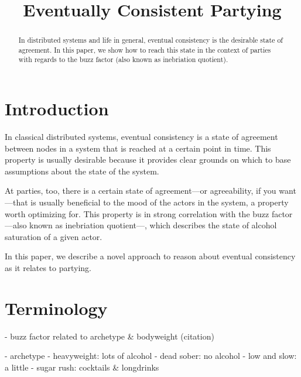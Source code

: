 \documentclass[9pt]{sigplanconf}
\title{Eventually Consistent Partying}
\begin{document}
\maketitle

\begin{abstract}
In distributed systems and life in general, eventual consistency is the
desirable state of agreement. In this paper, we show how to reach this state in
the context of parties with regards to the buzz factor (also known as
inebriation quotient).
\end{abstract}

\section{Introduction}

In classical distributed systems, eventual consistency is a state of agreement
between nodes in a system that is reached at a certain point in time. This
property is usually desirable because it provides clear grounds on which to
base assumptions about the state of the system.

At parties, too, there is a certain state of agreement—or agreeability, if you
want—that is usually beneficial to the mood of the actors in the system, a
property worth optimizing for. This property is in strong correlation with the
buzz factor—also known as inebriation quotient—, which describes the state of
alcohol saturation of a given actor.

In this paper, we describe a novel approach to reason about eventual
consistency as it relates to partying.

\section{Terminology}

- buzz factor related to archetype & bodyweight (citation)

- archetype
  - heavyweight: lots of alcohol
  - dead sober: no alcohol
  - low and slow: a little
  - sugar rush: cocktails & longdrinks
\end{document}
